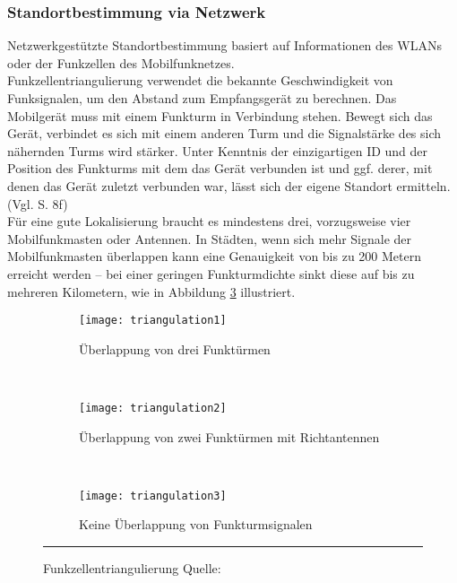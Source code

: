 \subsubsection{Standortbestimmung via Netzwerk}
Netzwerkgestützte Standortbestimmung basiert auf Informationen des \glspl{WLAN} oder der Funkzellen des Mobilfunknetzes.\\ 
Funkzellentriangulierung verwendet die bekannte Geschwindigkeit von Funksignalen, um den Abstand zum Empfangsgerät zu berechnen. Das Mobilgerät muss mit einem Funkturm in Verbindung stehen. Bewegt sich das Gerät, verbindet es sich mit einem anderen Turm und die Signalstärke des sich nähernden Turms wird stärker. Unter Kenntnis der einzigartigen ID und der Position des Funkturms mit dem das Gerät verbunden ist und ggf. derer, mit denen das Gerät zuletzt verbunden war, lässt sich der eigene Standort ermitteln. (Vgl. \cite{location} S. 8f) \\
Für eine gute Lokalisierung braucht es mindestens drei, vorzugsweise vier Mobilfunkmasten oder Antennen. In Städten, wenn sich mehr Signale der Mobilfunkmasten überlappen kann eine Genauigkeit von bis zu 200 Metern erreicht werden -- bei einer geringen Funkturmdichte sinkt diese auf bis zu mehreren Kilometern, wie in Abbildung \ref{fig:cell3} illustriert. \\
\begin{figure}[H]
        \centering
        \begin{subfigure}[t]{0.23\textwidth}
                \texttt{[image: triangulation1]}
                \caption{Überlappung von drei Funktürmen}
                \label{fig:cell1}
        \end{subfigure}
        ~ 
        \begin{subfigure}[t]{0.23\textwidth}
                \texttt{[image: triangulation2]}
                \caption{Überlappung von zwei Funktürmen mit Richtantennen}
                \label{fig:cell2}
        \end{subfigure}
         ~ 
        \begin{subfigure}[t]{0.23\textwidth}
                \texttt{[image: triangulation3]}
                \caption{Keine Überlappung von Funkturmsignalen}
                \label{fig:cell3}
        \end{subfigure}
        \rule{35em}{0.5pt}
        \caption[Funkzellentriangulierung]{Funkzellentriangulierung Quelle: \cite{fig:cell}}
        \label{fig:cell}
\end{figure}

